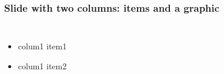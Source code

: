 \documentclass[]{beamer}
\begin{document}
\begin{frame}
  \frametitle{Slide with two columns: items and a graphic}   %
  \begin{columns}[c]
  \column{2in}  %
  \begin{itemize}
  \item colum1 item1
  \item colum1 item2
  \end{itemize}
  \column{2in}
  \end{columns}
\end{frame}
\end{document}
